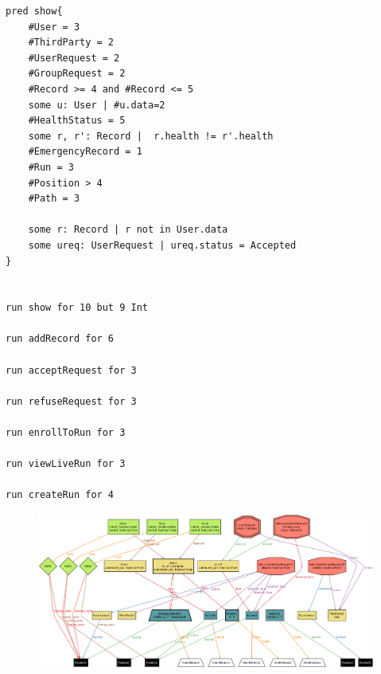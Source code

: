 \begin{verbatim}
pred show{
	#User = 3
	#ThirdParty = 2
	#UserRequest = 2
	#GroupRequest = 2
	#Record >= 4 and #Record <= 5
	some u: User | #u.data=2
	#HealthStatus = 5
	some r, r': Record |  r.health != r'.health
	#EmergencyRecord = 1
	#Run = 3
	#Position > 4
	#Path = 3
	
	some r: Record | r not in User.data
	some ureq: UserRequest | ureq.status = Accepted
}


run show for 10 but 9 Int

run addRecord for 6

run acceptRequest for 3

run refuseRequest for 3

run enrollToRun for 3

run viewLiveRun for 3

run createRun for 4

\end{verbatim}

\newpage

\begin{figure}[H]
    \centering
    \includegraphics[angle=90, scale=0.4]{./Pictures/alloy/alloy-world.png}
\end{figure}


